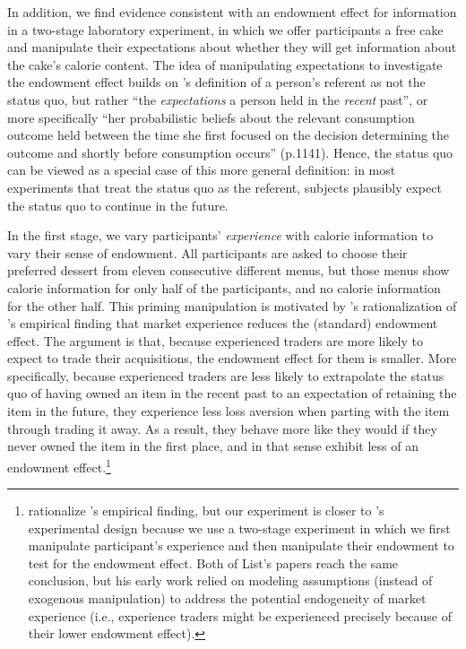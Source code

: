 In addition, we find evidence consistent with an endowment effect for information in a two-stage laboratory experiment, in which we offer participants a free cake and manipulate their expectations about whether they will get information about the cake’s calorie content. The idea of manipulating expectations to investigate the endowment effect builds on \citet{koszegiModelReferenceDependentPreferences2006}'s definition of a person’s referent as not the status quo, but rather \enquote{the \emph{expectations} a person held in the \emph{recent} past}, or more specifically \enquote{her probabilistic beliefs about the relevant consumption outcome held between the time she first focused on the decision determining the outcome and shortly before consumption occurs} (p.1141). Hence, the status quo can be viewed as a special case of this more general definition: in most experiments that treat the status quo as the referent, subjects plausibly expect the status quo to continue in the future.

In the first stage, we vary participants’ \emph{experience} with calorie information to vary their sense of endowment. All participants are asked to choose their preferred dessert from eleven consecutive different menus, but those menus show calorie information for only half of the participants, and no calorie information for the other half. This priming manipulation is motivated by \citet{koszegiModelReferenceDependentPreferences2006}'s rationalization of \citet{listDoesMarketExperience2003}'s empirical finding that market experience reduces the (standard) endowment effect. The argument is that, because experienced traders are more likely to expect to trade their acquisitions, the endowment effect for them is smaller. More specifically, because experienced traders are less likely to extrapolate the status quo of having owned an item in the recent past to an expectation of retaining the item in the future, they experience less loss aversion when parting with the item through trading it away. As a result, they behave more like they would if they never owned the item in the first place, and in that sense exhibit less of an endowment effect.\footnote{\citet{koszegiModelReferenceDependentPreferences2006} rationalize \citet{listDoesMarketExperience2003}'s empirical finding, but our experiment is closer to \citet{listDoesMarketExperience2011}'s experimental design because we use a two-stage experiment in which we first manipulate participant's experience and then manipulate their endowment to test for the endowment effect. Both of List's papers reach the same conclusion, but his early work relied on modeling assumptions (instead of exogenous manipulation) to address the potential endogeneity of market experience (i.e., experience traders might be experienced precisely because of their lower endowment effect).}

